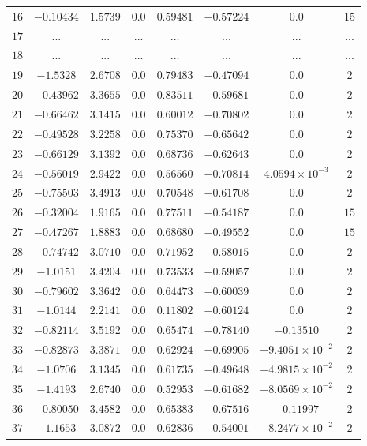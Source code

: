 \begin{landscape}
\begin{center}
\begin{longtable}{lccccccc}
$16$ & $-0.10434$ & $ 1.5739$ & $0.0$ & $ 0.59481$ & $-0.57224$ & $0.0$ & $15$ \\
$17$ & ... & ... & ... & ... & ... & ... & ... \\
$18$ & ... & ... & ... & ... & ... & ... & ... \\
$19$ & $-1.5328$ & $ 2.6708$ & $0.0$ & $ 0.79483$ & $-0.47094$ & $0.0$ & $2$ \\
$20$ & $-0.43962$ & $ 3.3655$ & $0.0$ & $ 0.83511$ & $-0.59681$ & $0.0$ & $2$ \\
$21$ & $-0.66462$ & $ 3.1415$ & $0.0$ & $ 0.60012$ & $-0.70802$ & $0.0$ & $2$ \\
$22$ & $-0.49528$ & $ 3.2258$ & $0.0$ & $ 0.75370$ & $-0.65642$ & $0.0$ & $2$ \\
$23$ & $-0.66129$ & $ 3.1392$ & $0.0$ & $ 0.68736$ & $-0.62643$ & $0.0$ & $2$ \\
$24$ & $-0.56019$ & $ 2.9422$ & $0.0$ & $ 0.56560$ & $-0.70814$ & $4.0594\times{}10^{-3}$ & $2$ \\
$25$ & $-0.75503$ & $ 3.4913$ & $0.0$ & $ 0.70548$ & $-0.61708$ & $0.0$ & $2$ \\
$26$ & $-0.32004$ & $ 1.9165$ & $0.0$ & $ 0.77511$ & $-0.54187$ & $0.0$ & $15$ \\
$27$ & $-0.47267$ & $ 1.8883$ & $0.0$ & $ 0.68680$ & $-0.49552$ & $0.0$ & $15$ \\
$28$ & $-0.74742$ & $ 3.0710$ & $0.0$ & $ 0.71952$ & $-0.58015$ & $0.0$ & $2$ \\
$29$ & $-1.0151$ & $ 3.4204$ & $0.0$ & $ 0.73533$ & $-0.59057$ & $0.0$ & $2$ \\
$30$ & $-0.79602$ & $ 3.3642$ & $0.0$ & $ 0.64473$ & $-0.60039$ & $0.0$ & $2$ \\
$31$ & $-1.0144$ & $ 2.2141$ & $0.0$ & $ 0.11802$ & $-0.60124$ & $0.0$ & $2$ \\
$32$ & $-0.82114$ & $ 3.5192$ & $0.0$ & $ 0.65474$ & $-0.78140$ & $-0.13510$ & $2$ \\
$33$ & $-0.82873$ & $ 3.3871$ & $0.0$ & $ 0.62924$ & $-0.69905$ & $-9.4051\times{}10^{-2}$ & $2$ \\
$34$ & $-1.0706$ & $ 3.1345$ & $0.0$ & $ 0.61735$ & $-0.49648$ & $-4.9815\times{}10^{-2}$ & $2$ \\
$35$ & $-1.4193$ & $ 2.6740$ & $0.0$ & $ 0.52953$ & $-0.61682$ & $-8.0569\times{}10^{-2}$ & $2$ \\
$36$ & $-0.80050$ & $ 3.4582$ & $0.0$ & $ 0.65383$ & $-0.67516$ & $-0.11997$ & $2$ \\
$37$ & $-1.1653$ & $ 3.0872$ & $0.0$ & $ 0.62836$ & $-0.54001$ & $-8.2477\times{}10^{-2}$ & $2$ \\

\end{longtable}
\end{center}
\end{landscape}
